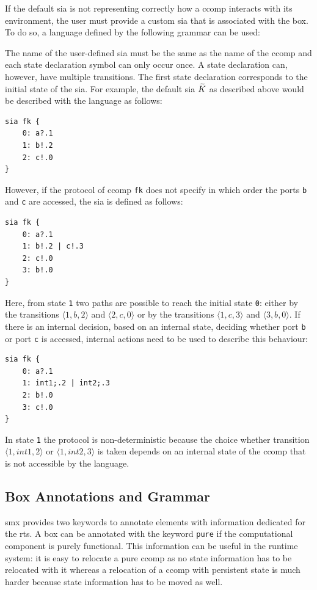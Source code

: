 If the default \gls{sia} is not representing correctly how a \gls*{ccomp} interacts with its environment, the user must provide a custom \gls{sia} that is associated with the box.
To do so, a language defined by the following grammar can be used:



The name of the user-defined \gls{sia} must be the same as the name of the \gls*{ccomp} and each state declaration symbol can only occur once.
A state declaration can, however, have multiple transitions.
The first state declaration corresponds to the initial state of the \gls{sia}.
For example, the default \gls{sia} $\widetilde{K}$ as described above would be described with the language as follows:
\begin{lstlisting}[style=sia]
sia fk {
    0: a?.1
    1: b!.2
    2: c!.0
}
\end{lstlisting}
However, if the protocol of \gls*{ccomp} \texttt{fk} does not specify in which order the ports \texttt{b} and \texttt{c} are accessed, the \gls{sia} is defined as follows:
\begin{lstlisting}[style=sia]
sia fk {
    0: a?.1
    1: b!.2 | c!.3
    2: c!.0
    3: b!.0
}
\end{lstlisting}
Here, from state \texttt{1} two paths are possible to reach the initial state \texttt{0}: either by the transitions $\langle 1, b, 2 \rangle$ and $\langle 2, c, 0 \rangle$ or by the transitions  $\langle 1, c, 3 \rangle$ and $\langle 3, b, 0 \rangle$.
If there is an internal decision, based on an internal state, deciding whether port \texttt{b} or port \texttt{c} is accessed, internal actions need to be used to describe this behaviour:
\begin{lstlisting}[style=sia]
sia fk {
    0: a?.1
    1: int1;.2 | int2;.3
    2: b!.0
    3: c!.0
}
\end{lstlisting}
In state \texttt{1} the protocol is non-deterministic because the choice whether transition $\langle 1, int1, 2 \rangle$ or $\langle 1, int2, 3 \rangle$ is taken depends on an internal state of the \gls*{ccomp} that is not accessible by the language.

\subsection{Box Annotations and Grammar}
\label{sect_smx_box_grammar}
\Gls*{smx} provides two keywords to annotate elements with information dedicated for the \gls{rts}.
A box can be annotated with the keyword \texttt{pure} if the computational component is purely functional.
This information can be useful in the runtime system: \eg it is easy to relocate a pure \gls*{ccomp} as no state information has to be relocated with it whereas a relocation of a \gls*{ccomp} with persistent state is much harder because state information has to be moved as well.

